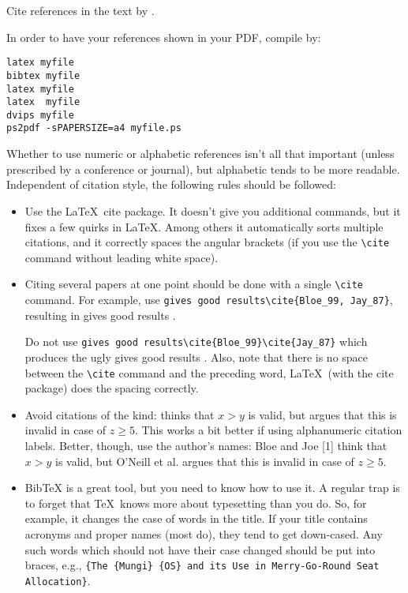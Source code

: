 \documentclass[a4paper,twoside, openright,12pt]{report}
\begin{document}
Cite references in the text by \cite{literaturstelle1}.

In order to have your references shown in your PDF, compile by:

\begin{verbatim} 
latex myfile
bibtex myfile
latex myfile
latex  myfile
dvips myfile
ps2pdf -sPAPERSIZE=a4 myfile.ps
\end{verbatim}

Whether to use numeric or alphabetic references isn't all that important (unless prescribed by a conference or journal), but alphabetic tends to be more readable. Independent of citation style, the following rules should be followed:

\begin{itemize}
\item Use the \LaTeX~cite package. It doesn't give you additional commands, but it fixes a few quirks in \LaTeX. Among others it automatically sorts multiple citations, and it correctly spaces the angular brackets (if you use the \verb|\cite| command without leading white space).

\item Citing several papers at one point should be done with a single \verb|\cite| command. For example, use \verb|gives good results\cite{Bloe_99, Jay_87}|, resulting in gives good results \cite{Bloe_99, Jay_87}. 

Do not use \verb|gives good results\cite{Bloe_99}\cite{Jay_87}| which produces the ugly gives good results \cite{Bloe_99}\cite{Jay_87}. Also, note that there is no space between the \verb|\cite| command and the preceding word, \LaTeX~(with the cite package) does the spacing correctly.


\item Avoid citations of the kind: \cite{Bloe_99} thinks that $x>y$ is valid, but \cite{ONeill_2000} argues that this is invalid in case of $z\geq5$. This works a bit better if using alphanumeric citation labels. Better, though, use the author's names: Bloe and Joe [1] think that $x>y$ is valid, but O'Neill et al. \cite{ONeill_2000} argues that this is invalid in case of $z\geq5$. 


\item BibTeX is a great tool, but you need to know how to use it. A regular trap is to forget that \TeX~knows more about typesetting than you do. So, for example, it changes the case of words in the title. If your title contains acronyms and proper names (most do), they tend to get down-cased. Any such words which should not have their case changed should be put into braces, e.g., \verb|{The {Mungi} {OS} and its Use in Merry-Go-Round Seat Allocation}|.



\end{itemize}
\end{document}
